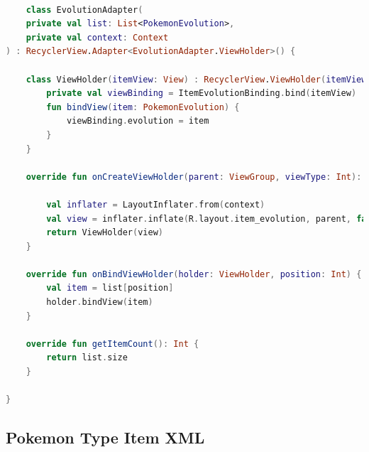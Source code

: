 \documentclass[a4paper, 12pt]{article}
\begin{document}
\begin{lstlisting}[caption={Pokemon Evolution Adapter.}, label={code:pk_evolution_adapter}, language=Kotlin]

    class EvolutionAdapter(
    private val list: List<PokemonEvolution>,
    private val context: Context
) : RecyclerView.Adapter<EvolutionAdapter.ViewHolder>() {

    class ViewHolder(itemView: View) : RecyclerView.ViewHolder(itemView) {
        private val viewBinding = ItemEvolutionBinding.bind(itemView)
        fun bindView(item: PokemonEvolution) {
            viewBinding.evolution = item
        }
    }

    override fun onCreateViewHolder(parent: ViewGroup, viewType: Int): ViewHolder {

        val inflater = LayoutInflater.from(context)
        val view = inflater.inflate(R.layout.item_evolution, parent, false)
        return ViewHolder(view)
    }

    override fun onBindViewHolder(holder: ViewHolder, position: Int) {
        val item = list[position]
        holder.bindView(item)
    }

    override fun getItemCount(): Int {
        return list.size
    }

}
\end{lstlisting}  


\subsection{Pokemon Type Item XML}
\end{document}
